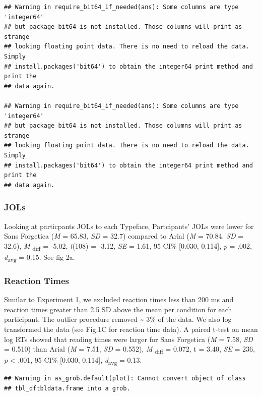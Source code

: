 \documentclass[
  english,
  man]{apa6}
\begin{document}
\begin{verbatim}
## Warning in require_bit64_if_needed(ans): Some columns are type 'integer64'
## but package bit64 is not installed. Those columns will print as strange
## looking floating point data. There is no need to reload the data. Simply
## install.packages('bit64') to obtain the integer64 print method and print the
## data again.

## Warning in require_bit64_if_needed(ans): Some columns are type 'integer64'
## but package bit64 is not installed. Those columns will print as strange
## looking floating point data. There is no need to reload the data. Simply
## install.packages('bit64') to obtain the integer64 print method and print the
## data again.
\end{verbatim}

\hypertarget{jols-1}{%
\subsubsection{JOLs}\label{jols-1}}

Looking at particpants JOLs to each Typeface, Partcipants' JOLs were lower for Sans Forgetica (\emph{M} = 65.83, \emph{SD} = 32.7) compared to Arial (\emph{M} = 70.84. \emph{SD} = 32.6), \emph{M} \textsubscript{diff} = -5.02, \emph{t}(108) = -3.12, \emph{SE} = 1.61, 95 CI\% {[}0.030, 0.114{]}, \emph{p} = .002, \emph{d}\textsubscript{avg} = 0.15. See fig 2a.

\hypertarget{reaction-times}{%
\subsubsection{Reaction Times}\label{reaction-times}}

Similar to Experiment 1, we excluded reaction times less than 200 ms and reaction times greater than 2.5 SD above the mean per condition for each participant. The outlier procedure removed \textasciitilde{} 3\% of the data. We also log transformed the data (see Fig.1C for reaction time data). A paired t-test on mean log RTs showed that reading times were larger for Sans Forgetica (\emph{M} = 7.58, \emph{SD} = 0.510) than Arial (\emph{M} = 7.51, \emph{SD} = 0.552), \emph{M} \textsubscript{diff} = 0.072, t = 3.40, \emph{SE} = 236, \emph{p} \textless{} .001, 95 CI\% {[}0.030, 0.114{]}, \emph{d}\textsubscript{avg} = 0.13.

\begin{verbatim}
## Warning in as_grob.default(plot): Cannot convert object of class
## tbl_dftbldata.frame into a grob.
\end{verbatim}
\end{document}
